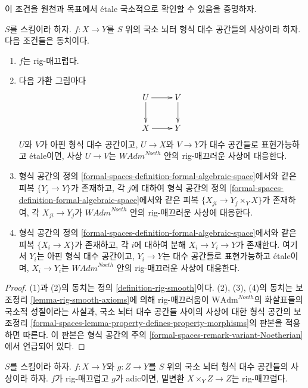 \noindent
이 조건을 원천과 목표에서 \'etale 국소적으로 확인할 수 있음을 증명하자.

\begin{lemma}
\label{lemma-rig-smooth-morphisms}
$S$를 스킴이라 하자. $f : X \to Y$를 $S$ 위의 국소 뇌터
형식 대수 공간들의 사상이라 하자. 다음 조건들은 동치이다.
\begin{enumerate}
\item $f$는 rig-매끄럽다.
\item 다음 가환 그림마다
$$
\xymatrix{
U \ar[d] \ar[r] & V \ar[d] \\
X \ar[r] & Y
}
$$
$U$와 $V$가 아핀 형식 대수 공간이고, $U \to X$와 $V \to Y$가
대수 공간들로 표현가능하고 \'etale이면, 사상 $U \to V$는
$\textit{WAdm}^{Noeth}$ 안의 rig-매끄러운 사상에 대응한다.
\item 형식 공간의 정의
\ref{formal-spaces-definition-formal-algebraic-space}에서와 같은
피복 $\{Y_j \to Y\}$가 존재하고, 각 $j$에 대하여 형식 공간의 정의
\ref{formal-spaces-definition-formal-algebraic-space}에서와 같은
피복 $\{X_{ji} \to Y_j \times_Y X\}$가 존재하여, 각
$X_{ji} \to Y_j$가 $\textit{WAdm}^{Noeth}$ 안의 rig-매끄러운 사상에 대응한다.
\item 형식 공간의 정의
\ref{formal-spaces-definition-formal-algebraic-space}에서와 같은
피복 $\{X_i \to X\}$가 존재하고, 각 $i$에 대하여 분해
$X_i \to Y_i \to Y$가 존재한다. 여기서 $Y_i$는 아핀 형식 대수 공간이고,
$Y_i \to Y$는 대수 공간들로 표현가능하고 \'etale이며,
$X_i \to Y_i$는 $\textit{WAdm}^{Noeth}$ 안의 rig-매끄러운 사상에 대응한다.
\end{enumerate}
\end{lemma}

\begin{proof}
(1)과 (2)의 동치는 정의 \ref{definition-rig-smooth}이다.
(2), (3), (4)의 동치는 보조정리 \ref{lemma-rig-smooth-axioms}에 의해
rig-매끄러움이 $\text{WAdm}^{Noeth}$의 화살표들의 국소적 성질이라는 사실과,
국소 뇌터 대수 공간들 사이의 사상에 대한 형식 공간의 보조정리
\ref{formal-spaces-lemma-property-defines-property-morphisms}의 판본을
적용하면 따른다. 이 판본은 형식 공간의 주의
\ref{formal-spaces-remark-variant-Noetherian}에서 언급되어 있다.
\end{proof}

\begin{lemma}
\label{lemma-base-change-rig-smooth}
$S$를 스킴이라 하자. $f : X \to Y$와 $g : Z \to Y$를
$S$ 위의 국소 뇌터 형식 대수 공간들의 사상이라 하자.
$f$가 rig-매끄럽고 $g$가 adic이면, 밑변환
$X \times_Y Z \to Z$는 rig-매끄럽다.
\end{lemma}

